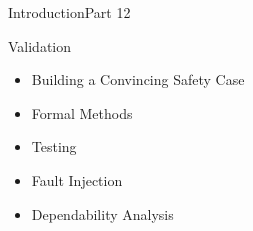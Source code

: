 \begin{frame}{Introduction}{Part 12}
    \begin{block}{Validation}
\begin{itemize}
\item
  Building a Convincing Safety Case
\item
  Formal Methods
\item
  Testing
\item
  Fault Injection
\item
  Dependability Analysis
\end{itemize}
\end{block}
\end{frame}
